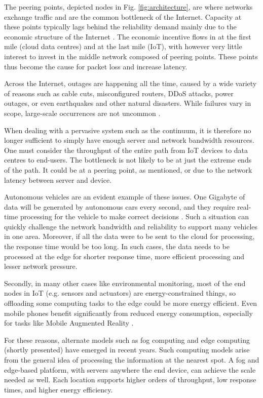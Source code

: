 The peering points, depicted nodes in Fig. \ref{fig:architecture}, are where networks exchange traffic and are the common bottleneck of the Internet. Capacity at these points typically lags behind the reliability demand mainly due to the economic structure of the Internet \cite{nygren2010akamai}. The economic incentive flows in at the first mile (cloud data centres) and at the last mile (IoT), with however very little interest to invest in the middle network composed of peering points. These points thus become the cause for packet loss and increase latency.

Across the Internet, outages are happening all the time, caused by a wide variety of reasons such as cable cuts, misconfigured routers, DDoS attacks, power outages, or even earthquakes and other natural disasters. While failures vary in scope, large-scale occurrences are not uncommon \cite{aws-outage}.

When dealing with a pervasive system such as the continuum, it is therefore no longer sufficient to simply have enough server and network bandwidth resources. One must consider the throughput of the entire path from IoT devices to data centres to end-users. The bottleneck is not likely to be at just the extreme ends of the path. It could be at a peering point, as mentioned, or due to the network latency between server and device. 

Autonomous vehicles are an evident example of these issues. One Gigabyte of data will be generated by autonomous cars every second, and they require real-time processing for the vehicle to make correct decisions \cite{shi2016edge}. Such a situation can quickly challenge the network bandwidth and reliability to support many vehicles in one area. Moreover, if all the data were to be sent to the cloud for processing, the response time would be too long. In such cases, the data needs to be processed at the edge for shorter response time, more efficient processing and lesser network pressure.

Secondly, in many other cases like environmental monitoring, most of the end nodes in IoT (e.g. sensors and actuators) are energy-constrained things, so offloading some computing tasks to the edge could be more energy efficient. Even mobile phones benefit significantly from reduced energy consumption, especially for tasks like Mobile Augmented Reality \cite{baresi2017empowering}.

For these reasons, alternate models such as fog computing and edge computing (shortly presented) have emerged in recent years. Such computing models arise from the general idea of processing the information at the nearest spot. A fog and edge-based platform, with servers anywhere the end device, can achieve the scale needed as well. Each location supports higher orders of throughput, low response times, and higher energy efficiency.

